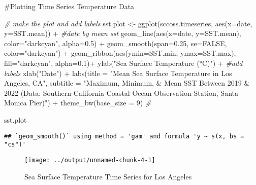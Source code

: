 \documentclass[]{tufte-handout}
\newenvironment{Shaded}{}{}
\newcommand{\AttributeTok}[1]{\textcolor[rgb]{0.49,0.56,0.16}{#1}}
\newcommand{\CommentTok}[1]{\textcolor[rgb]{0.38,0.63,0.69}{\textit{#1}}}
\newcommand{\ConstantTok}[1]{\textcolor[rgb]{0.53,0.00,0.00}{#1}}
\newcommand{\DecValTok}[1]{\textcolor[rgb]{0.25,0.63,0.44}{#1}}
\newcommand{\FloatTok}[1]{\textcolor[rgb]{0.25,0.63,0.44}{#1}}
\newcommand{\FunctionTok}[1]{\textcolor[rgb]{0.02,0.16,0.49}{#1}}
\newcommand{\NormalTok}[1]{#1}
\newcommand{\OtherTok}[1]{\textcolor[rgb]{0.00,0.44,0.13}{#1}}
\newcommand{\SpecialCharTok}[1]{\textcolor[rgb]{0.25,0.44,0.63}{#1}}
\newcommand{\StringTok}[1]{\textcolor[rgb]{0.25,0.44,0.63}{#1}}
\begin{document}
\#Plotting Time Series Temperature Data

\begin{Shaded}
\begin{Highlighting}[]
\CommentTok{\# make the plot and add labels}
\NormalTok{sst.plot }\OtherTok{\textless{}{-}} \FunctionTok{ggplot}\NormalTok{(sccoss.timeseries, }\FunctionTok{aes}\NormalTok{(}\AttributeTok{x=}\NormalTok{date, }\AttributeTok{y=}\NormalTok{SST.mean)) }\SpecialCharTok{+} \CommentTok{\#date by mean sst}
  \FunctionTok{geom\_line}\NormalTok{(}\FunctionTok{aes}\NormalTok{(}\AttributeTok{x=}\NormalTok{date, }\AttributeTok{y=}\NormalTok{SST.mean), }\AttributeTok{color=}\StringTok{"darkcyan"}\NormalTok{, }\AttributeTok{alpha=}\FloatTok{0.5}\NormalTok{) }\SpecialCharTok{+}
  \FunctionTok{geom\_smooth}\NormalTok{(}\AttributeTok{span=}\FloatTok{0.25}\NormalTok{, }\AttributeTok{se=}\ConstantTok{FALSE}\NormalTok{, }\AttributeTok{color=}\StringTok{"darkcyan"}\NormalTok{) }\SpecialCharTok{+}
  \FunctionTok{geom\_ribbon}\NormalTok{(}\FunctionTok{aes}\NormalTok{(}\AttributeTok{ymin=}\NormalTok{SST.min, }\AttributeTok{ymax=}\NormalTok{SST.max), }\AttributeTok{fill=}\StringTok{"darkcyan"}\NormalTok{, }\AttributeTok{alpha=}\FloatTok{0.1}\NormalTok{)}\SpecialCharTok{+}
  \FunctionTok{ylab}\NormalTok{(}\StringTok{"Sea Surface Temperature (°C)"}\NormalTok{) }\SpecialCharTok{+}  \CommentTok{\#add labels}
  \FunctionTok{xlab}\NormalTok{(}\StringTok{"Date"}\NormalTok{) }\SpecialCharTok{+}
\FunctionTok{labs}\NormalTok{(}\AttributeTok{title =} \StringTok{"Mean Sea Surface Temperature in Los Angeles, CA"}\NormalTok{, }\AttributeTok{subtitle =} \StringTok{"Maximum, Minimum, \& Mean SST Between 2019 \& 2022 }
\StringTok{(Data: Southern California Coastal Ocean Observation Station, Santa Monica Pier)"}\NormalTok{) }\SpecialCharTok{+}
  \FunctionTok{theme\_bw}\NormalTok{(}\AttributeTok{base\_size =} \DecValTok{9}\NormalTok{) }\CommentTok{\#}

\NormalTok{sst.plot}
\end{Highlighting}
\end{Shaded}

\begin{verbatim}
## `geom_smooth()` using method = 'gam' and formula 'y ~ s(x, bs = "cs")'
\end{verbatim}

\begin{figure}
\texttt{[image: ../output/unnamed-chunk-4-1]} \caption[Sea Surface Temperature Time Series for Los Angeles]{Sea Surface Temperature Time Series for Los Angeles}\label{fig:unnamed-chunk-4}
\end{figure}
\end{document}
